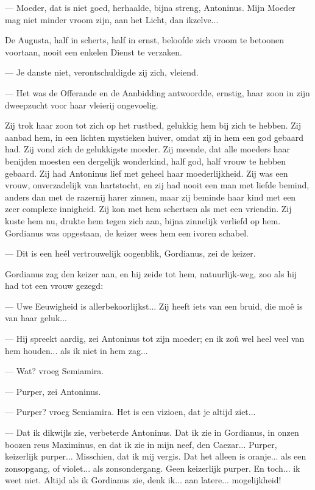 \documentclass[a4paper, 12pt, oneside, dutch]{article}
\begin{document}
--- Moeder, dat is niet goed, herhaalde, bijna streng, Antoninus. Mijn Moeder mag niet minder vroom zijn, aan het Licht, dan ikzelve...

De Augusta, half in scherts, half in ernst, beloofde zich vroom te betoonen voortaan, nooit een enkelen Dienst te verzaken.

--- Je danste niet, verontschuldigde zij zich, vleiend.

--- Het was de Offerande en de Aanbidding antwoordde, ernstig, haar zoon in zijn dweepzucht voor haar vleierij ongevoelig.

Zij trok haar zoon tot zich op het rustbed, gelukkig hem bij zich te hebben. Zij aanbad hem, in een lichten mystieken huiver, omdat zij in hem een god gebaard had. Zij vond zich de gelukkigste moeder. Zij meende, dat alle moeders haar benijden moesten een dergelijk wonderkind, half god, half vrouw te hebben gebaard. Zij had Antoninus lief met geheel haar moederlijkheid. Zij was een vrouw, onverzadelijk van hartstocht, en zij had nooit een man met liefde bemind, anders dan met de razernij harer zinnen, maar zij beminde haar kind met een zeer complexe innigheid. Zij kon met hem schertsen als met een vriendin. Zij kuste hem nu, drukte hem tegen zich aan, bijna zinnelijk verliefd op hem. Gordianus was opgestaan, de keizer wees hem een ivoren schabel.

--- Dit is een heél vertrouwelijk oogenblik, Gordianus, zei de keizer.

Gordianus zag den keizer aan, en hij zeide tot hem, natuurlijk-weg, zoo als hij had tot een vrouw gezegd:

--- Uwe Eeuwigheid is allerbekoorlijkst... Zij heeft iets van een bruid, die moê is van haar geluk...

--- Hij spreekt aardig, zei Antoninus tot zijn moeder; en ik zoû wel heel veel van hem houden... als ik niet in hem zag...

--- Wat? vroeg Semiamira.

--- Purper, zei Antoninus.

--- Purper? vroeg Semiamira. Het is een vizioen, dat je altijd ziet...

--- Dat ik dikwijls zie, verbeterde Antoninus. Dat ik zie in Gordianus, in onzen boozen reus Maximinus, en dat ik zie in mijn neef, den Caezar... Purper, keizerlijk purper... Misschien, dat ik mij vergis. Dat het alleen is oranje... als een zonsopgang, of violet... als zonsondergang. Geen keizerlijk purper. En toch... ik weet niet. Altijd als ik Gordianus zie, denk ik... aan latere... mogelijkheid!
\end{document}
